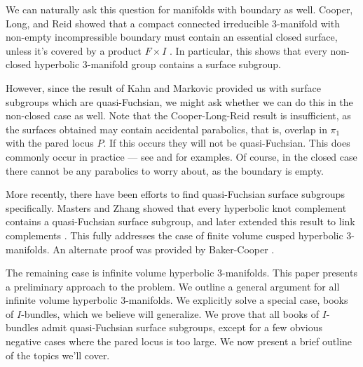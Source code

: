 We can naturally ask this question for manifolds with boundary as well.
Cooper, Long, and Reid showed that a compact connected irreducible 3-manifold
with non-empty incompressible boundary  must contain an essential closed
surface, unless it's covered by a product $F\times I$ \cite{CLR}. In
particular, this shows that every non-closed hyperbolic 3-manifold group
contains a surface subgroup.

However, since the result of Kahn and Markovic provided us with surface
subgroups which are quasi-Fuchsian, we might ask whether we can do this in the
non-closed case as well. Note that the Cooper-Long-Reid result is insufficient,
as the surfaces obtained may contain accidental parabolics, that is, overlap in
$\pi_1$ with the pared locus $P$. If this occurs they will not be
quasi-Fuchsian. This does commonly occur in practice --- see \cite{CLRbundles}
and \cite{MenascoReid} for examples. Of course, in the closed case there cannot
be any parabolics to worry about, as the boundary is empty.

More recently, there have been efforts to find quasi-Fuchsian surface subgroups
specifically. Masters and Zhang \cite{MZ} showed that every hyperbolic knot
complement contains a quasi-Fuchsian surface subgroup, and later extended this
result to link complements \cite{MZ2}. This fully addresses the case of finite
volume cusped hyperbolic 3-manifolds. An alternate proof was provided by
Baker-Cooper \cite{BC}.

The remaining case is infinite volume hyperbolic 3-manifolds. This paper
presents a preliminary approach to the problem. We outline a general argument
for all infinite volume hyperbolic 3-manifolds. We explicitly solve a special
case, books of $I$-bundles, which we believe will generalize. We prove that all
books of $I$-bundles admit quasi-Fuchsian surface subgroups, except for a few
obvious negative cases where the pared locus is too large. We now present
a brief outline of the topics we'll cover.


